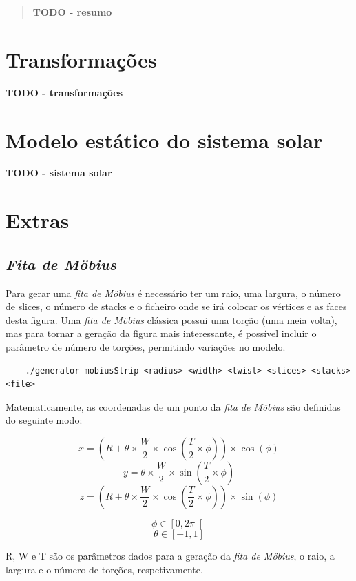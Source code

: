 \documentclass[12pt, a4paper]{article}
\begin{document}
\pagebreak

\begin{abstract}
    \textbf{\color{red} TODO - resumo}
\end{abstract}

\section{Transformações}

\textbf{\color{red} TODO - transformações}

\section{Modelo estático do sistema solar}

\textbf{\color{red} TODO - sistema solar}

\section{Extras}

\subsection{\emph{Fita de Möbius}}

Para gerar uma \emph{fita de Möbius} é necessário ter um raio, uma largura, o número de slices,
o número de stacks e o ficheiro onde se irá colocar os vértices e as faces desta figura.
Uma \emph{fita de Möbius} clássica possui uma torção (uma meia volta), mas para tornar a geração
da figura mais interessante, é possível incluir o parâmetro de número de torções, permitindo
variações no modelo.
\begin{verbatim}
    ./generator mobiusStrip <radius> <width> <twist> <slices> <stacks> <file>
\end{verbatim}

Matematicamente, as coordenadas de um ponto da \emph{fita de Möbius} são definidas do seguinte modo:

$$x = (R + \theta \times \frac{W}{2} \times \cos (\frac{T}{2} \times \phi)) \times
\cos (\phi)$$
$$y = \theta \times \frac{W}{2} \times \sin (\frac{T}{2} \times \phi)$$
$$z = (R + \theta \times \frac{W}{2} \times \cos (\frac{T}{2} \times \phi)) \times
\sin (\phi)$$

$$\phi \in \left [ 0, 2 \pi \right [$$
$$\theta \in \left [ -1, 1 \right ]$$

R, W e T são os parâmetros dados para a geração da \emph{fita de Möbius}, o raio, a
largura e o número de torções, respetivamente.
\end{document}
